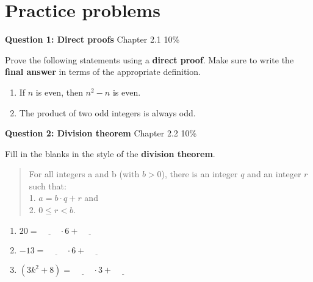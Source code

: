 \documentclass[a4paper,12pt]{book}
\title{}
\author{Rachel Morris}
\date{\today}
\begin{document}

\section*{Practice problems}

\textbf{Question 1: Direct proofs}
\hfill
Chapter 2.1
\hfill
10\%

Prove the following statements using a \textbf{direct proof}.
Make sure to write the \textbf{final answer} in terms of
the appropriate definition.

\begin{enumerate}
	\item		If $ n $ is even, then $ n^{2} - n $ is even.
	\item		The product of two odd integers is always odd.
\end{enumerate}

\hrulefill

\textbf{Question 2: Division theorem}
\hfill
Chapter 2.2
\hfill
10\%

Fill in the blanks in the style of the \textbf{division theorem}.

\begin{quote} For all integers a and b (with $ b > 0 $),
there is an integer $ q $ and an integer $ r $ such that: \\
1. $ a = b \cdot q + r $ and \\
2. $ 0 \leq r < b $.
\end{quote}

\begin{enumerate}	
	\item		$ 20 = 				\underline{\hspace{1cm}} \cdot 		6 + \underline{\hspace{1cm}} $
	\item	$ -13 = 			\underline{\hspace{1cm}} \cdot 		6 + \underline{\hspace{1cm}} $
	\item	$ (3k^{2} + 8) = 	\underline{\hspace{1cm}} \cdot 		3 + \underline{\hspace{1cm}} $
\end{enumerate}
\end{document}
